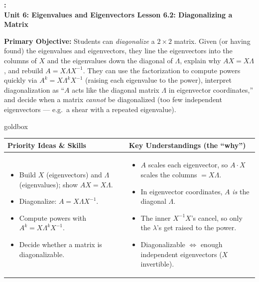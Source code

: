 \documentclass[10pt]{article}
\newcommand{\UnitNumberName}{Unit 6: Eigenvalues and Eigenvectors \quad}
\newcommand{\LessonNumberName}{Lesson 6.2: Diagonalizing a Matrix}
\begin{document}
\begin{center}
    {\Large\bfseries \CourseName: \SchoolYear \\
    {\small\bfseries \UnitNumberName \LessonNumberName}}
\end{center}

\begin{tcolorbox}[colback=blush, colframe=burgundy, boxrule=0.9pt, arc=2mm,
    left=2mm, right=2mm, top=1.5mm, bottom=1.5mm]
    \textbf{Primary Objective:} Students can \emph{diagonalize} a $2\times2$ matrix. Given (or having
    found) the eigenvalues and eigenvectors, they line the eigenvectors into the columns of $X$ and the
    eigenvalues down the diagonal of $\Lambda$, explain why $AX=X\Lambda$, and rebuild
    $A=X\Lambda X^{-1}$. They can use the factorization to compute powers quickly via
    $A^k=X\Lambda^k X^{-1}$ (raising each eigenvalue to the power), interpret diagonalization as ``$A$ acts
    like the diagonal matrix $\Lambda$ in eigenvector coordinates,'' and decide when a matrix \emph{cannot}
    be diagonalized (too few independent eigenvectors --- e.g.\ a shear with a repeated eigenvalue).
\end{tcolorbox}

\renewcommand{\arraystretch}{1.4}
\begin{skillbox}{goldbox}
\begin{tabularx}{\linewidth}{@{}X|X@{}}
\textbf{Priority Ideas \& Skills} & \textbf{Key Understandings (the ``why'')} \\[2pt]
\hline
\vspace{-6pt}
\begin{itemize}[leftmargin=1.1em, nosep, after=\vspace{2pt}]
  \item Build $X$ (eigenvectors) and $\Lambda$ (eigenvalues); show $AX=X\Lambda$.
  \item Diagonalize: $A=X\Lambda X^{-1}$.
  \item Compute powers with $A^k=X\Lambda^k X^{-1}$.
  \item Decide whether a matrix is diagonalizable.
\end{itemize}
&
\vspace{-6pt}
\begin{itemize}[leftmargin=1.1em, nosep, after=\vspace{2pt}]
  \item $A$ scales each eigenvector, so $A\cdot X$ scales the columns $=X\Lambda$.
  \item In eigenvector coordinates, $A$ \emph{is} the diagonal $\Lambda$.
  \item The inner $X^{-1}X$'s cancel, so only the $\lambda$'s get raised to the power.
  \item Diagonalizable $\Leftrightarrow$ enough independent eigenvectors ($X$ invertible).
\end{itemize}
\end{tabularx}
\end{skillbox}
\end{document}
